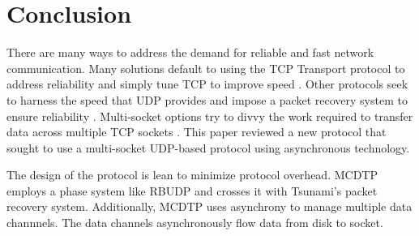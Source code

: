 \chapter{Conclusion}

There are many ways to address the demand for reliable and fast network communication. Many solutions default to using the TCP Transport protocol to address reliability and simply tune TCP to improve speed \cite{brakmo1995tcp}\cite{wei2006fast}\cite{ha2008cubic}. Other protocols seek to harness the speed that UDP provides and impose a packet recovery system to ensure reliability \cite{He2002}\cite{Aspera2016}\cite{Fan2010}\cite{Meiss2007}\cite{gu2007udt}. Multi-socket options try to divvy the work required to transfer data across multiple TCP sockets \cite{Allman1995}\cite{Allman1997}\cite{Sivakumar2000psockets}. This paper reviewed a new protocol that sought to use a multi-socket UDP-based protocol using asynchronous technology. 

The design of the protocol is lean to minimize protocol overhead. MCDTP employs a phase system like RBUDP and crosses it with Tsunami's packet recovery system. Additionally, MCDTP uses asynchrony to manage multiple data channnels. The data channels asynchronously flow data from disk to socket.